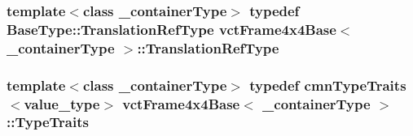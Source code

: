 \subsubsection[{Translation\+Ref\+Type}]{\setlength{\rightskip}{0pt plus 5cm}template$<$class \+\_\+container\+Type$>$ typedef Base\+Type\+::\+Translation\+Ref\+Type {\bf vct\+Frame4x4\+Base}$<$ \+\_\+container\+Type $>$\+::{\bf Translation\+Ref\+Type}}\label{classvct_frame4x4_base_a0450063a4ebdf0f0c87c7f3fa789a17f}
\hypertarget{classvct_frame4x4_base_ac03fa3e28721aea50a67d65e86963bd7}{}
\subsubsection[{Type\+Traits}]{\setlength{\rightskip}{0pt plus 5cm}template$<$class \+\_\+container\+Type$>$ typedef {\bf cmn\+Type\+Traits}$<$value\+\_\+type$>$ {\bf vct\+Frame4x4\+Base}$<$ \+\_\+container\+Type $>$\+::{\bf Type\+Traits}}\label{classvct_frame4x4_base_ac03fa3e28721aea50a67d65e86963bd7}


